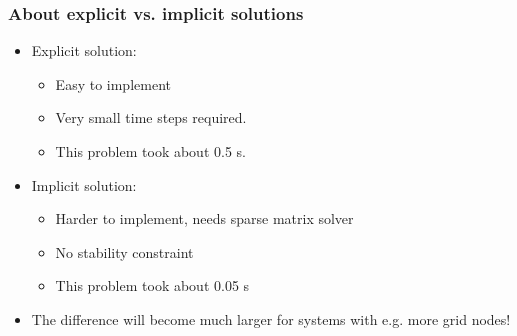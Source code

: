 \begin{frame}
  \frametitle{About explicit vs. implicit solutions}
  \begin{itemize}
    \item Explicit solution:
    \begin{itemize}
      \item Easy to implement
      \item Very small time steps required.
      \item This problem took about 0.5 \si{\second}.
    \end{itemize}
    \item Implicit solution:
    \begin{itemize}
      \item Harder to implement, needs sparse matrix solver
      \item No stability constraint
      \item This problem took about 0.05 \si{\second}
    \end{itemize}
    \item The difference will become much larger for systems with e.g. more grid nodes!
  \end{itemize}
\end{frame}


